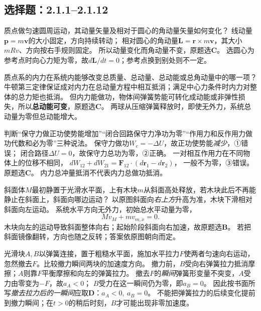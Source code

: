 
\subsection{选择题：2.1.1--2.1.12}
\problemtext 质点做匀速圆周运动，其动量矢量及相对于圆心的角动量矢量如何变化？
\workings 线动量$\bm p=m\bm v$的大小固定，方向持续转动；
相对圆心的角动量$\bm L=\bm r\times m\bm v$，其大小$mRv$、方向按右手规则固定。
所以动量变化而角动量不变，原题选\textbf{C}。
\crosscheck 选圆心为参考点时向心力矩为零，故$d\bm L/dt=0$；参考点换到别处则不一定。

\problemtext 质点系的内力在系统内能够改变总质量、总动量、总动能或总角动量中的哪一项？
\workings
牛顿第三定律保证成对内力在总动量方程中相互抵消；满足中心力条件时内力对整体的总力矩也抵消。
但内力能做功，物体间弹簧势能可转化成动能或非弹性损失，所以\textbf{总动能可变}，原题选\textbf{C}。
\crosscheck 两球从压缩弹簧释放时，即使无外力，系统总动量为零但总动能增大。

\problemtext 判断“保守力做正功使势能增加”“闭合回路保守力净功为零”“作用力和反作用力做功代数和必为零”三种说法。
\workings
保守力做功$W_c=-\Delta U$，故正功使势能\emph{减少}，①错误；
闭合路径$\Delta U=0$，故保守力总功为零，②正确。
一对相互作用力在不同物体上的位移不相同，
$dW_{12}+dW_{21}=\bm F_{12}\cdot(d\bm r_1-d\bm r_2)$，
一般不为零，③错误。原题选\textbf{C}。
\crosscheck 内力总冲量抵消不代表内力总做功抵消。

\problemtext 斜面体$M$最初静置于光滑水平面，上有木块$m$从斜面高处释放，若木块此后不再能静止在斜面上，斜面向哪边运动？
\workings
以原图斜面向\emph{右上方}升高为准，木块下滑相对斜面向左运动。
系统水平方向无外力，初始总水平动量为零，
\[
M v_M+m v_{m,x}=0.
\]
木块向左的运动导致斜面整体向右；起始阶段斜面向右加速，故原题选\textbf{B}。
\crosscheck 若把斜面镜像翻转，方向也随之反转；答案依原图朝向而定。

\problemtext 光滑块$A,B$以弹簧连接，置于粗糙水平面，施加水平拉力$F$使两者匀速向右运动，忽然撤去$F$。比较撤力瞬间两块的加速度方向。
\workings
撤力前，$B$受向右弹簧拉力抵消摩擦；$A$则靠$F$平衡摩擦和向左的弹簧拉力。
撤去$F$的\emph{瞬间}弹簧形变量不突变，$A$受力由零变为$-F$，故$a_A<0$；
$B$受力在这一瞬间仍为零，即$a_B=0$。
因此按书面所写\emph{撤去拉力后的一瞬间}应取\textbf{D}：$a_A<0,\ a_B=0$。
\crosscheck 不能把弹簧拉力的后续变化提前到撤力瞬间；在$t>0$的稍后时刻，$B$才可能出现非零加速度。

